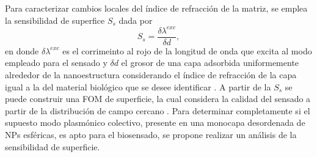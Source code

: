 Para caracterizar cambios locales del índice de refracción de la matriz, se emplea la sensibilidad de superfice $S_s$ dada por \cite{estevez2014trends}
%
\begin{equation}
S_s=  \frac{\delta \lambda^{exc}}{\delta d},
\end{equation}
%
en donde $\delta \lambda^{exc}$ es el corrimeinto al rojo de la longitud de onda que excita al modo empleado para el sensado y $\delta d$ el grosor de una capa  adsorbida uniformemente alrededor de la nanoestructura considerando el índice de refracción de la capa igual a la del material biológico que se desee identificar  \cite{estevez2014trends}. A partir de la $S_s$ se puede construir una FOM de superficie, la cual considera la calidad del sensado a partir de la distribución de campo cercano \cite{estevez2014trends,svedendahl2009refractometric}. Para determinar completamente si el supuesto modo  plasmónico colectivo, presente en una monocapa desordenada de NPs esféricas, es apto para el biosensado, se propone realizar un análisis de la  sensibilidad de superficie.


